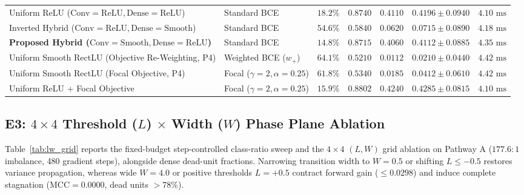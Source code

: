 \documentclass[10pt,a4paper]{article}
\begin{document}
\begin{table}[t]
\begin{tabular}{llccccc}
Uniform ReLU ($\text{Conv}=\text{ReLU}, \text{Dense}=\text{ReLU}$) & Standard BCE & $18.2\%$ & $0.8740$ & $0.4110$ & $0.4196 \pm 0.0940$ & $4.10\text{ ms}$ \\
Inverted Hybrid ($\text{Conv}=\text{ReLU}, \text{Dense}=\text{Smooth}$) & Standard BCE & $54.6\%$ & $0.5840$ & $0.0620$ & $0.0715 \pm 0.0890$ & $4.18\text{ ms}$ \\
\textbf{Proposed Hybrid ($\text{Conv}=\text{Smooth}, \text{Dense}=\text{ReLU}$)} & Standard BCE & $\mathbf{14.8\%}$ & $\mathbf{0.8715}$ & $\mathbf{0.4060}$ & $\mathbf{0.4112 \pm 0.0885}$ & $4.35\text{ ms}$ \\
Uniform Smooth RectLU (Objective Re-Weighting, P4) & Weighted BCE ($w_+$) & $64.1\%$ & $0.5210$ & $0.0112$ & $0.0210 \pm 0.0440$ & $4.42\text{ ms}$ \\
Uniform Smooth RectLU (Focal Objective, P4) & Focal ($\gamma=2, \alpha=0.25$) & $61.8\%$ & $0.5340$ & $0.0185$ & $0.0412 \pm 0.0610$ & $4.42\text{ ms}$ \\
Uniform ReLU + Focal Objective & Focal ($\gamma=2, \alpha=0.25$) & $15.9\%$ & $0.8802$ & $0.4240$ & $0.4285 \pm 0.0815$ & $4.10\text{ ms}$ \\
\bottomrule
\end{tabular}
\end{table}

\subsection{E3: $4 \times 4$ Threshold ($L$) $\times$ Width ($W$) Phase Plane Ablation}
Table~\ref{tab:lw_grid} reports the fixed-budget step-controlled class-ratio sweep and the $4 \times 4$ $(L, W)$ grid ablation on Pathway A ($177.6:1$ imbalance, 480 gradient steps), alongside dense dead-unit fractions. Narrowing transition width to $W=0.5$ or shifting $L \le -0.5$ restores variance propagation, whereas wide $W=4.0$ or positive thresholds $L=+0.5$ contract forward gain ($\le 0.0298$) and induce complete stagnation ($\text{MCC} = 0.0000$, dead units $>78\%$).
\end{document}
